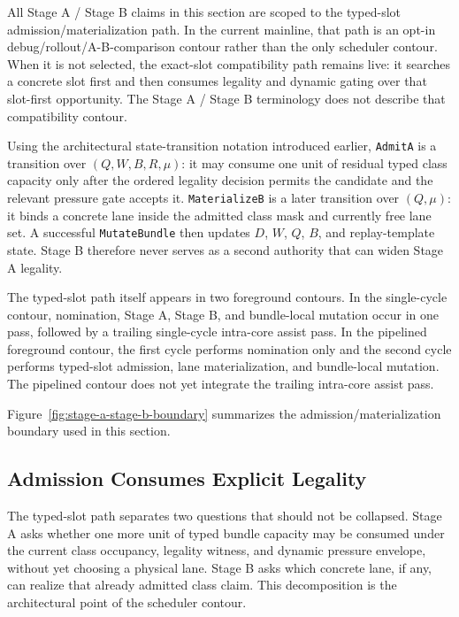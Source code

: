 \documentclass[twocolumn]{article}
\begin{document}
All Stage A / Stage B claims in this section are scoped to the typed-slot admission/materialization path. In the current mainline, that path is an opt-in debug/rollout/A-B-comparison contour rather than the only scheduler contour. When it is not selected, the exact-slot compatibility path remains live: it searches a concrete slot first and then consumes legality and dynamic gating over that slot-first opportunity. The Stage A / Stage B terminology does not describe that compatibility contour.

Using the architectural state-transition notation introduced earlier, \texttt{AdmitA} is a transition over \((Q,W,B,R,\mu)\): it may consume one unit of residual typed class capacity only after the ordered legality decision permits the candidate and the relevant pressure gate accepts it. \texttt{MaterializeB} is a later transition over \((Q,\mu)\): it binds a concrete lane inside the admitted class mask and currently free lane set. A successful \texttt{MutateBundle} then updates \(D\), \(W\), \(Q\), \(B\), and replay-template state. Stage B therefore never serves as a second authority that can widen Stage A legality.

The typed-slot path itself appears in two foreground contours. In the single-cycle contour, nomination, Stage A, Stage B, and bundle-local mutation occur in one pass, followed by a trailing single-cycle intra-core assist pass. In the pipelined foreground contour, the first cycle performs nomination only and the second cycle performs typed-slot admission, lane materialization, and bundle-local mutation. The pipelined contour does not yet integrate the trailing intra-core assist pass.

Figure~\ref{fig:stage-a-stage-b-boundary} summarizes the admission/materialization boundary used in this section.






\subsection{Admission Consumes Explicit Legality}

The typed-slot path separates two questions that should not be collapsed. Stage A asks whether one more unit of typed bundle capacity may be consumed under the current class occupancy, legality witness, and dynamic pressure envelope, without yet choosing a physical lane. Stage B asks which concrete lane, if any, can realize that already admitted class claim. This decomposition is the architectural point of the scheduler contour.
\end{document}
